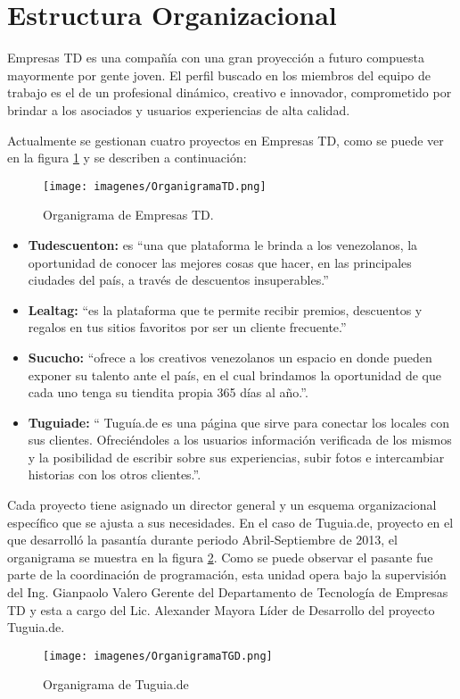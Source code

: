 \section{Estructura Organizacional} \label{sect:Estructura_organizacional}

Empresas TD es una compañía con una gran proyección a futuro compuesta mayormente 
por gente joven. El perfil buscado en los miembros del equipo de trabajo es el de 
un profesional dinámico, creativo e innovador, comprometido por brindar a los
asociados y usuarios experiencias de alta calidad. 

Actualmente se gestionan cuatro proyectos en Empresas TD, como se puede ver en la figura \ref{fig:ogtd} y se describen a continuación:

\begin{figure}[h]
	\begin{center}
		\texttt{[image: imagenes/OrganigramaTD.png]}
	\end{center}
	\caption{
		\label{fig:ogtd}
		Organigrama de Empresas TD.
	}
\end{figure}

\begin{itemize}
  \item \textbf{Tudescuenton:} es ``una que plataforma le brinda a los venezolanos, la oportunidad de conocer las mejores cosas que hacer, en las principales ciudades del país, a través de descuentos insuperables.'' \cite{TDC}
  \item \textbf{Lealtag:} ``es la plataforma que te permite recibir premios, descuentos y regalos en tus sitios favoritos por ser un cliente frecuente.''\cite{LTG}
  \item \textbf{Sucucho:} ``ofrece a los creativos venezolanos un espacio en donde pueden exponer su talento ante el país, en el cual brindamos la oportunidad de que cada uno tenga su tiendita propia 365 días al año.''\cite{SCC}.
  \item \textbf{Tuguiade:} `` Tuguía.de es una página que sirve para conectar los locales con sus clientes. Ofreciéndoles a los usuarios información verificada de los mismos y la posibilidad de escribir sobre sus experiencias, subir fotos e intercambiar historias con los otros clientes.''\cite{TGD}. 
\end{itemize}
  
Cada proyecto tiene asignado un director general y un esquema organizacional específico que se ajusta a sus necesidades. En el caso de Tuguia.de, proyecto en el que desarrolló la pasantía durante periodo Abril-Septiembre de 2013, el organigrama se muestra en la figura \ref{fig:ogtgd}. Como se puede observar el pasante fue parte de la coordinación de programación, esta unidad opera bajo la supervisión del Ing. Gianpaolo Valero Gerente del Departamento de Tecnología de Empresas TD y esta a cargo del Lic. Alexander Mayora Líder de Desarrollo del proyecto Tuguia.de.

\begin{figure}[h]
	\begin{center}
		\texttt{[image: imagenes/OrganigramaTGD.png]}
	\end{center}
	\caption{
		\label{fig:ogtgd}
		Organigrama de Tuguia.de
	}
\end{figure}
 